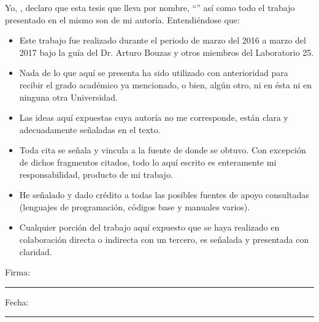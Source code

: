 \documentclass[
11pt, %
spanish, %
singlespacing, %
headsepline, %
]{MastersDoctoralThesis} %
\begin{document}

\begin{declaration}
\addchaptertocentry{\authorshipname} %
\noindent Yo, \authorname, declaro que esta tesis que lleva por nombre, \enquote{\ttitle} así como todo el trabajo presentado en el mismo son de mi autoría. Entendiéndose que:

\begin{itemize} 
\item Este trabajo fue realizado durante el periodo de marzo del 2016 a marzo del 2017 bajo la guía del Dr. Arturo Bouzas y otros miembros del Laboratorio 25. 
\item Nada de lo que aquí se presenta ha sido utilizado con anterioridad para recibir el grado académico ya mencionado, o bien, algún otro, ni en ésta ni en ninguna otra Universidad. 
\item Las ideas aquí expuestas cuya autoría no me corresponde, están clara y adecuadamente señaladas en el texto. 
\item Toda cita se señala y vincula a la fuente de donde se obtuvo. Con excepción de dichos fragmentos citados, todo lo aquí escrito es enteramente mi responsabilidad, producto de mi trabajo. 
\item He señalado y dado crédito a todas las posibles fuentes de apoyo consultadas (lenguajes de programación, códigos base y manuales varios).
\item Cualquier porción del trabajo aquí expuesto que se haya realizado en colaboración directa o indirecta con un tercero, es señalada y presentada con claridad.\\
\end{itemize}
 
\noindent Firma:\\
\rule[0.5em]{25em}{0.5pt} %
 
\noindent Fecha:\\
\rule[0.5em]{25em}{0.5pt} %
\end{declaration}

\cleardoublepage

\end{document}
